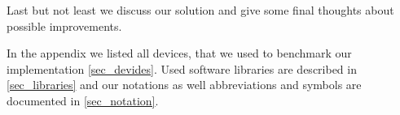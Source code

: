 Last but not least we discuss our solution and give some final thoughts about possible improvements.

In the appendix we listed all devices, that we used to benchmark our implementation \ref{sec_devides}. Used software libraries are described in \ref{sec_libraries} and our notations as well abbreviations and symbols are documented in \ref{sec_notation}.

